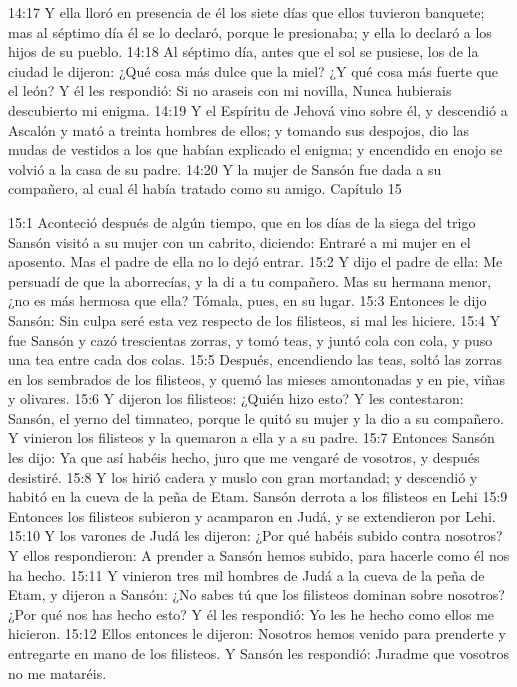 14:17 Y ella lloró en presencia de él los siete días que ellos tuvieron banquete; mas al séptimo día él se lo declaró, porque le presionaba; y ella lo declaró a los hijos de su pueblo.  
14:18 Al séptimo día, antes que el sol se pusiese, los de la ciudad le dijeron:  
¿Qué cosa más dulce que la miel?  
¿Y qué cosa más fuerte que el león?  
Y él les respondió:  
Si no araseis con mi novilla,  
Nunca hubierais descubierto mi enigma.  
14:19 Y el Espíritu de Jehová vino sobre él, y descendió a Ascalón y mató a treinta hombres de ellos; y tomando sus despojos, dio las mudas de vestidos a los que habían explicado el enigma; y encendido en enojo se volvió a la casa de su padre.  
14:20 Y la mujer de Sansón fue dada a su compañero, al cual él había tratado como su amigo.  
Capítulo 15 

15:1 Aconteció después de algún tiempo, que en los días de la siega del trigo Sansón visitó a su mujer con un cabrito, diciendo: Entraré a mi mujer en el aposento. Mas el padre de ella no lo dejó entrar.  
15:2 Y dijo el padre de ella: Me persuadí de que la aborrecías, y la di a tu compañero. Mas su hermana menor, ¿no es más hermosa que ella? Tómala, pues, en su lugar.  
15:3 Entonces le dijo Sansón: Sin culpa seré esta vez respecto de los filisteos, si mal les hiciere.  
15:4 Y fue Sansón y cazó trescientas zorras, y tomó teas, y juntó cola con cola, y puso una tea entre cada dos colas.  
15:5 Después, encendiendo las teas, soltó las zorras en los sembrados de los filisteos, y quemó las mieses amontonadas y en pie, viñas y olivares.  
15:6 Y dijeron los filisteos: ¿Quién hizo esto? Y les contestaron: Sansón, el yerno del timnateo, porque le quitó su mujer y la dio a su compañero. Y vinieron los filisteos y la quemaron a ella y a su padre.  
15:7 Entonces Sansón les dijo: Ya que así habéis hecho, juro que me vengaré de vosotros, y después desistiré.  
15:8 Y los hirió cadera y muslo con gran mortandad; y descendió y habitó en la cueva de la peña de Etam.  
Sansón derrota a los filisteos en Lehi  
15:9 Entonces los filisteos subieron y acamparon en Judá, y se extendieron por Lehi.  
15:10 Y los varones de Judá les dijeron: ¿Por qué habéis subido contra nosotros? Y ellos respondieron: A prender a Sansón hemos subido, para hacerle como él nos ha hecho.  
15:11 Y vinieron tres mil hombres de Judá a la cueva de la peña de Etam, y dijeron a Sansón: ¿No sabes tú que los filisteos dominan sobre nosotros? ¿Por qué nos has hecho esto? Y él les respondió: Yo les he hecho como ellos me hicieron.  
15:12 Ellos entonces le dijeron: Nosotros hemos venido para prenderte y entregarte en mano de los filisteos. Y Sansón les respondió: Juradme que vosotros no me mataréis.  
